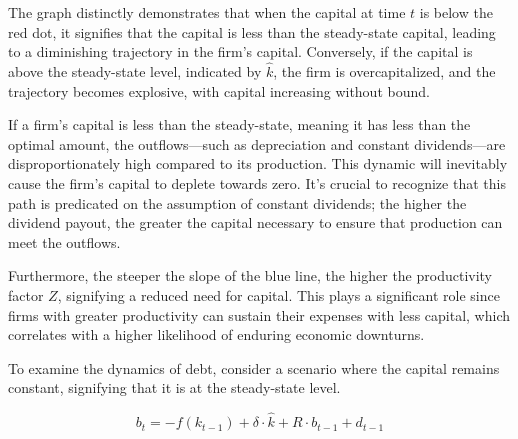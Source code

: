 \documentclass[12pt]{article}
\begin{document}
The graph distinctly demonstrates that when the capital at time \(t\) is below the red dot, it signifies that the
capital is less than the steady-state capital, leading to a diminishing trajectory in the firm's capital. Conversely, if
the capital is above the steady-state level, indicated by \(\widehat{k}\), the firm is overcapitalized, and the
trajectory becomes explosive, with capital increasing without bound. 

If a firm's capital is less than the steady-state, meaning it has less than the optimal amount, the outflows—such as
depreciation and constant dividends—are disproportionately high compared to its production. This dynamic will inevitably
cause the firm's capital to deplete towards zero. It's crucial to recognize that this path is predicated on the
assumption of constant dividends; the higher the dividend payout, the greater the capital necessary to ensure that
production can meet the outflows. 

Furthermore, the steeper the slope of the blue line, the higher the productivity factor \(Z\), signifying a reduced need
for capital. This plays a significant role since firms with greater productivity can sustain their expenses with less
capital, which correlates with a higher likelihood of enduring economic downturns. 

To examine the dynamics of debt, consider a scenario where the capital remains constant, signifying that it is at the
steady-state level. 

\[ b_{t} =  - f(k_{t-1}) + \delta \cdot \widehat{k} + R \cdot b_{t-1} + d_{t-1}\]
\end{document}
